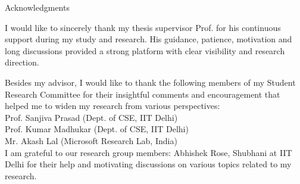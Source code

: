 \begin{center}
\LARGE{Acknowledgments} 
\end{center}

\vspace{0.5in}

\noindent I would like to sincerely thank my thesis supervisor Prof. \Guide{}
for his continuous support during my study and research.
His guidance, patience, motivation and long discussions provided a
strong platform with clear visibility and research direction.

\noindent Besides my advisor, I would like to thank the following members of
my Student Research Committee for their insightful comments and encouragement
that helped me to widen my research from various perspectives: \\
Prof. Sanjiva Prasad (Dept. of CSE, IIT Delhi) \\
Prof. Kumar Madhukar (Dept. of CSE, IIT Delhi) \\
Mr. Akash Lal (Microsoft Research Lab, India) \\

\noindent I am grateful to our research group members: Abhishek Rose, Shubhani at IIT Delhi for
their help and motivating discussions on various topics related to my research.

\vspace{0.8in}


\begin{flushright}
\noindent {\bfseries \Auth{}}
\end{flushright}
